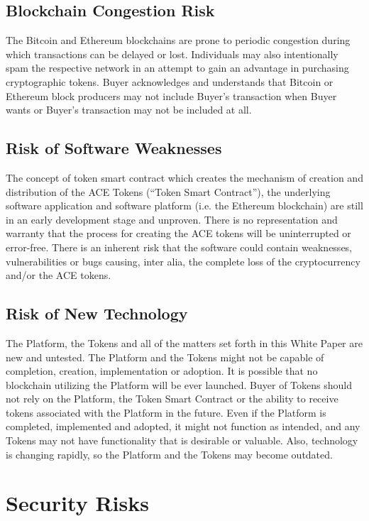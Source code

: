 \documentclass[12pt]{report}
\newcommand{\hlc}[1]{\colorbox{yellow!25}{#1}}
\begin{document}
\begin{multicols}{2}
\subsection{Blockchain Congestion Risk}
\label{risks-block-congestion}
The Bitcoin and Ethereum blockchains are prone to periodic congestion during which transactions can be delayed or lost. Individuals may also intentionally spam the respective network in an attempt to gain an advantage in purchasing cryptographic tokens. Buyer acknowledges and understands that Bitcoin or Ethereum block producers may not include Buyer’s transaction when Buyer wants or Buyer’s transaction may not be included at all.

\subsection{\hlc{Risk of Software Weaknesses}}
\label{risks-block-weaknesses}
The concept of token smart contract which creates the mechanism of creation and distribution of the ACE Tokens (“Token Smart Contract”), the underlying software application and software platform (i.e. the Ethereum blockchain) are still in an early development stage and unproven. There is no representation and warranty that the process for creating the ACE tokens will be uninterrupted or error-free. There is an inherent risk that the software could contain weaknesses, vulnerabilities or bugs causing, inter alia, the complete loss of the cryptocurrency and/or the ACE
tokens.

\subsection{Risk of New Technology}
The Platform, the Tokens and all of the matters set forth in this White Paper are new and untested. The Platform and the Tokens might not be capable of completion, creation, implementation or adoption. It is possible that no blockchain utilizing the Platform will be ever launched. Buyer of Tokens should not rely on the Platform,
the Token Smart Contract or the ability to receive tokens associated with the Platform in the future. Even if the Platform is completed, implemented and adopted, it might not function as intended, and any Tokens may not have functionality that is desirable or valuable. Also, technology is changing rapidly, so the Platform and the Tokens may become outdated.

\section{Security Risks}


\end{multicols}
\end{document}
